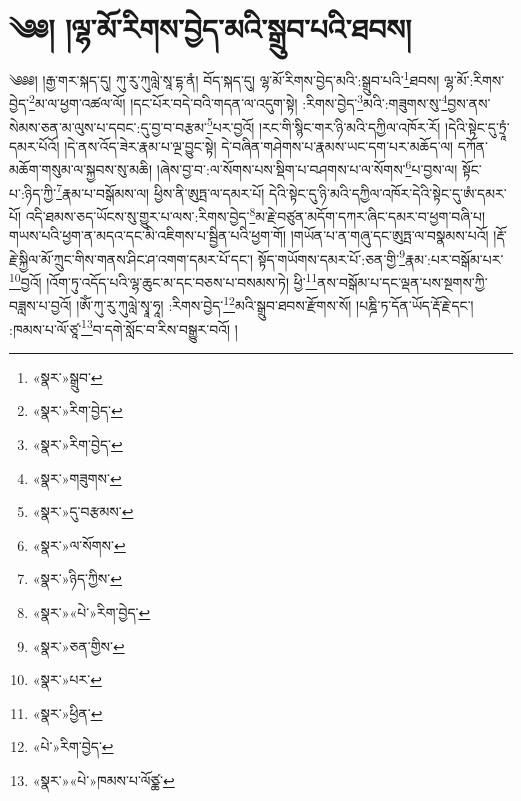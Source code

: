 \chapter{༄༅། །ལྷ་མོ་རིགས་བྱེད་མའི་སྒྲུབ་པའི་ཐབས།}༄༅༅། །རྒྱ་གར་སྐད་དུ། ཀུ་རུ་ཀུལླེ་སཱ་དྷ་ནཾ། བོད་སྐད་དུ། ལྷ་མོ་རིགས་བྱེད་མའི་:སྒྲུབ་པའི་\footnote{«སྣར་»སྒྲུབ་}ཐབས། ལྷ་མོ་:རིགས་བྱེད་\footnote{«སྣར་»རིག་བྱེད་}མ་ལ་ཕྱག་འཚལ་ལོ། །དང་པོར་བདེ་བའི་གདན་ལ་འདུག་སྟེ། :རིགས་བྱེད་\footnote{«སྣར་»རིག་བྱེད་}མའི་:གཟུགས་སུ་\footnote{«སྣར་»གཟུགས་}བྱས་ནས་སེམས་ཅན་མ་ལུས་པ་དབང་:དུ་བྱ་བ་བརྩམ་\footnote{«སྣར་»དུ་བརྩམས་}པར་བྱའོ། །རང་གི་སྙིང་གར་ཉི་མའི་དཀྱིལ་འཁོར་རོ། །དེའི་སྟེང་དུ་ཏྲཱཾ་དམར་པོའོ། །དེ་ནས་འོད་ཟེར་རྣམ་པ་ལྔ་བྱུང་སྟེ། དེ་བཞིན་གཤེགས་པ་རྣམས་ཡང་དག་པར་མཆོད་ལ། དཀོན་མཆོག་གསུམ་ལ་སྐྱབས་སུ་མཆི། །ཞེས་བྱ་བ་:ལ་སོགས་པས་སྡིག་པ་བཤགས་པ་ལ་སོགས་\footnote{«སྣར་»ལ་སོགས་}པ་བྱས་ལ། སྟོང་པ་:ཉིད་ཀྱི་\footnote{«སྣར་»ཉིད་ཀྱིས་}རྣམ་པ་བསྒོམས་ལ། ཕྱིས་ནི་ཨུཏྤ་ལ་དམར་པོ། དེའི་སྟེང་དུ་ཉི་མའི་དཀྱིལ་འཁོར་དེའི་སྟེང་དུ་ཨཾ་དམར་པོ། འདི་ཐམས་ཅད་ཡོངས་སུ་གྱུར་པ་ལས་:རིགས་བྱེད་\footnote{«སྣར་»«པེ་»རིག་བྱེད་}མ་རྗེ་བཙུན་མདོག་དཀར་ཞིང་དམར་བ་ཕྱག་བཞི་པ། གཡས་པའི་ཕྱག་ན་མདའ་དང་མི་འཇིགས་པ་སྦྱིན་པའི་ཕྱག་གོ། །གཡོན་པ་ན་གཞུ་དང་ཨུཏྤ་ལ་བསྣམས་པའོ། །རྡོ་རྗེ་སྐྱིལ་མོ་ཀྲུང་གིས་གནས་ཤིང་ཤ་འགག་དམར་པོ་དང་། སྟོད་གཡོགས་དམར་པོ་:ཅན་གྱི་\footnote{«སྣར་»ཅན་གྱིས་}རྣམ་:པར་བསྒོམ་པར་\footnote{«སྣར་»པར་}བྱའོ། །འོག་ཏུ་འདོད་པའི་ལྷ་ཆུང་མ་དང་བཅས་པ་བསམས་ཏེ། ཕྱི་\footnote{«སྣར་»ཕྱིན་}ནས་བསྒོམ་པ་དང་ལྡན་པས་སྔགས་ཀྱི་བཟླས་པ་བྱའོ། །ཨོཾ་ཀུ་རུ་ཀུལླེ་སྭཱ་ཧཱ། :རིགས་བྱེད་\footnote{«པེ་»རིག་བྱེད་}མའི་སྒྲུབ་ཐབས་རྫོགས་སོ། །པཎྜི་ཏ་དོན་ཡོད་རྡོ་རྗེ་དང་། :ཁམས་པ་ལོ་ཙཱ་\footnote{«སྣར་»«པེ་»ཁམས་པ་ལོཙྪ་}བ་དགེ་སློང་བ་རིས་བསྒྱུར་བའོ། ། 